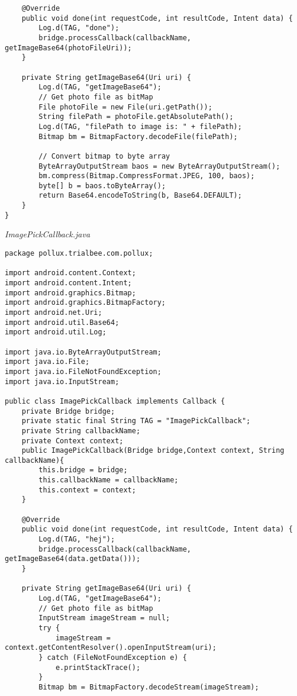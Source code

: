 \begin{appendices}
\begin{lstlisting}
    @Override
    public void done(int requestCode, int resultCode, Intent data) {
        Log.d(TAG, "done");
        bridge.processCallback(callbackName, getImageBase64(photoFileUri));
    }

    private String getImageBase64(Uri uri) {
        Log.d(TAG, "getImageBase64");
        // Get photo file as bitMap
        File photoFile = new File(uri.getPath());
        String filePath = photoFile.getAbsolutePath();
        Log.d(TAG, "filePath to image is: " + filePath);
        Bitmap bm = BitmapFactory.decodeFile(filePath);

        // Convert bitmap to byte array
        ByteArrayOutputStream baos = new ByteArrayOutputStream();
        bm.compress(Bitmap.CompressFormat.JPEG, 100, baos);
        byte[] b = baos.toByteArray();
        return Base64.encodeToString(b, Base64.DEFAULT);
    }
}
\end{lstlisting}
\emph{ImagePickCallback.java}
\begin{lstlisting}
package pollux.trialbee.com.pollux;

import android.content.Context;
import android.content.Intent;
import android.graphics.Bitmap;
import android.graphics.BitmapFactory;
import android.net.Uri;
import android.util.Base64;
import android.util.Log;

import java.io.ByteArrayOutputStream;
import java.io.File;
import java.io.FileNotFoundException;
import java.io.InputStream;

public class ImagePickCallback implements Callback {
    private Bridge bridge;
    private static final String TAG = "ImagePickCallback";
    private String callbackName;
    private Context context;
    public ImagePickCallback(Bridge bridge,Context context, String callbackName){
        this.bridge = bridge;
        this.callbackName = callbackName;
        this.context = context;
    }

    @Override
    public void done(int requestCode, int resultCode, Intent data) {
        Log.d(TAG, "hej");
        bridge.processCallback(callbackName, getImageBase64(data.getData()));
    }

    private String getImageBase64(Uri uri) {
        Log.d(TAG, "getImageBase64");
        // Get photo file as bitMap
        InputStream imageStream = null;
        try {
            imageStream = context.getContentResolver().openInputStream(uri);
        } catch (FileNotFoundException e) {
            e.printStackTrace();
        }
        Bitmap bm = BitmapFactory.decodeStream(imageStream);


\end{lstlisting}
\end{appendices}
